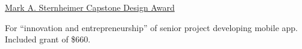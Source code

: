 \documentclass[11pt,letterpaper,serif]{moderncv}
\begin{document}
{\href{https://egr.vcu.edu/capstone/sternheimer-awards/}{Mark A. Sternheimer Capstone Design Award}}
{}{}
{
	\begin{adjustwidth}{.25in}{}
		For ``innovation and entrepreneurship'' of senior project developing mobile app. Included grant of \$660.
	\end{adjustwidth}
}

\end{document}
